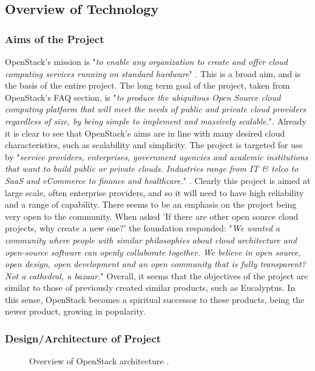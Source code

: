 \subsection{Overview of Technology}
\subsubsection{Aims of the Project}
OpenStack's mission is "\textit{to enable any organization to create and offer cloud computing services running on standard hardware}" \cite{openstackhomepage}. This is a broad aim, and is the basis of the entire project. 
The long term goal of the project, taken from OpenStack's FAQ section, is "\textit{to produce the ubiquitous Open Source cloud computing platform that will meet the needs of public and private cloud providers regardless of size, by being simple to implement and massively scalable.}"\cite{openstackfaq}. Already it is clear to see that OpenStack's aims are in line with many desired cloud characteristics, such as scalability and simplicity. 
The project is targeted for use by "\textit{service providers, enterprises, government agencies and academic institutions that want to build public or private clouds. Industries range from IT \& telco to SaaS and eCommerce to finance and healthcare.}" \cite{openstackfaq}. Clearly this project is aimed at large scale, often enterprise providers, and so it will need to have high reliability and a range of capability. 
There seems to be an emphasis on the project being very open to the community. When asked 'If there are other open source cloud projects, why create a new one?' the foundation responded: "\textit{We wanted a community where people with similar philosophies about cloud architecture and open-source software can openly collaborate together. We believe in open source, open design, open development and an open community that is fully transparent? Not a cathedral, a bazaar.}"\cite{openstackfaq}
Overall, it seems that the objectives of the project are similar to those of previously created similar products, such as Eucalyptus. In this sense, OpenStack becomes a spiritual successor to these products, being the newer product, growing in popularity. 

\subsubsection{Design/Architecture of Project}
\begin{figure}[ht]
\centering
{}
\caption{Overview of OpenStack architecture \cite{openstacksoftware}.}
\end{figure}

